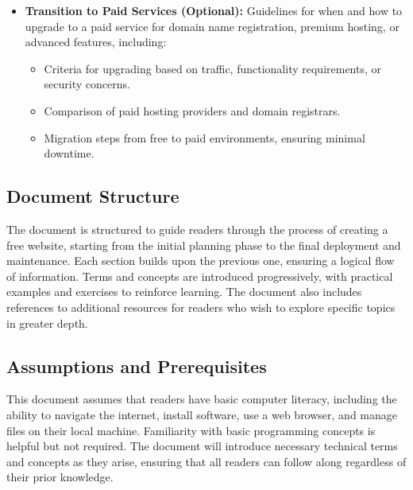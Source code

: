 \begin{itemize}
    \item \textbf{Transition to Paid Services (Optional):} Guidelines for when and how to upgrade to a paid service for domain name registration, premium hosting, or advanced features, including:
    \begin{itemize}
        \item Criteria for upgrading based on traffic, functionality requirements, or security concerns.
        \item Comparison of paid hosting providers and domain registrars.
        \item Migration steps from free to paid environments, ensuring minimal downtime.
    \end{itemize}
\end{itemize}

\subsection{Document Structure}

The document is structured to guide readers through the process of creating a free website, starting from the initial planning phase to the final deployment and maintenance. Each section builds upon the previous one, ensuring a logical flow of information. Terms and concepts are introduced progressively, with practical examples and exercises to reinforce learning. The document also includes references to additional resources for readers who wish to explore specific topics in greater depth.

\subsection{Assumptions and Prerequisites}

This document assumes that readers have basic computer literacy, including the ability to navigate the internet, install software, use a web browser, and manage files on their local machine. Familiarity with basic programming concepts is helpful but not required. The document will introduce necessary technical terms and concepts as they arise, ensuring that all readers can follow along regardless of their prior knowledge.